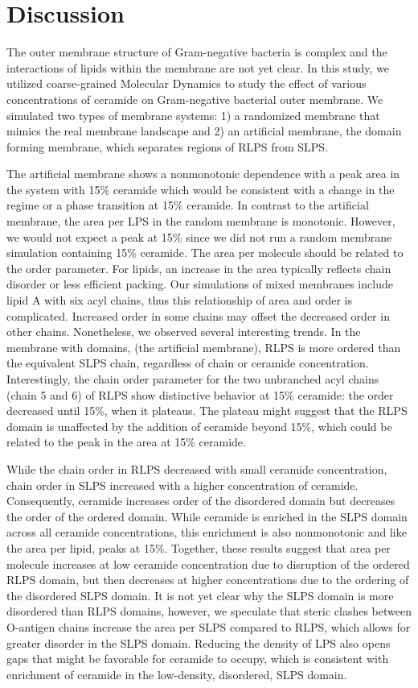 \documentclass[10pt, letterpaper]{article}
\begin{document}
\newpage

\section{Discussion}

The outer membrane structure of Gram-negative bacteria is complex and the interactions of lipids within the membrane are not yet clear. In this study, we utilized coarse-grained Molecular Dynamics to study the effect of various concentrations of ceramide on Gram-negative bacterial outer membrane. We simulated two types of membrane systems: 1) a randomized membrane that mimics the real membrane landscape and 2) an artificial membrane, the domain forming membrane, which separates regions of RLPS from SLPS. 

The artificial membrane shows a nonmonotonic dependence with a peak area in the system with 15\% ceramide which would be consistent with a change in the regime or a phase transition at 15\% ceramide. In contrast to the artificial membrane, the area per LPS in the random membrane is monotonic. However, we would not expect a peak at 15\% since we did not run a random membrane simulation containing 15\% ceramide. The area per molecule should be related to the order parameter. For lipids, an increase in the area typically reflects chain disorder or less efficient packing. Our simulations of mixed membranes include lipid A with six acyl chains, thus this relationship of area and order is complicated. Increased order in some chains may offset the decreased order in other chains. Nonetheless, we observed several interesting trends. In the membrane with domains, (the artificial membrane), RLPS is more ordered than the equivalent SLPS chain, regardless of chain or ceramide concentration. Interestingly, the chain order parameter for the two unbranched acyl chains (chain 5 and 6) of RLPS show distinctive behavior at 15\% ceramide: the order decreased until 15\%, when it plateaus. The plateau might suggest that the RLPS domain is unaffected by the addition of ceramide beyond 15\%, which could be related to the peak in the area at 15\% ceramide. 

\par While the chain order in RLPS decreased with small ceramide concentration, chain order in SLPS increased with a higher concentration of ceramide. Consequently, ceramide increases order of the disordered domain but decreases the order of the ordered domain. While ceramide is enriched in the SLPS domain across all ceramide concentrations, this enrichment is also nonmonotonic and like the area per lipid, peaks at 15\%. Together, these results suggest that area per molecule increases at low ceramide concentration due to disruption of the ordered RLPS domain, but then decreases at higher concentrations due to the ordering of the disordered SLPS domain. It is not yet clear why the SLPS domain is more disordered than RLPS domains, however, we speculate that steric clashes between O-antigen chains increase the area per SLPS compared to RLPS, which allows for greater disorder in the SLPS domain. Reducing the density of LPS also opens gaps that might be favorable for ceramide to occupy, which is consistent with enrichment of ceramide in the low-density, disordered, SLPS domain.
\end{document}
